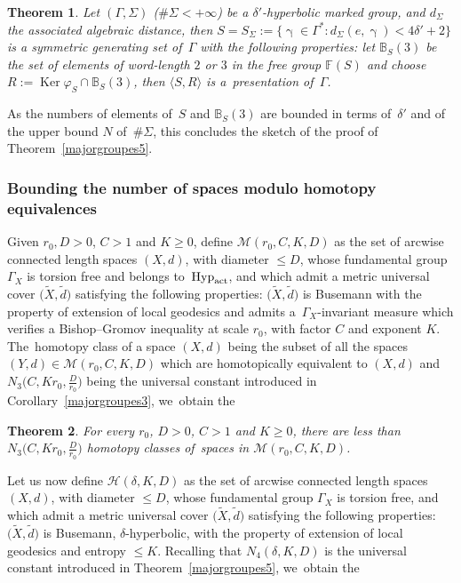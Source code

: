 \documentclass[10pt,a4paper]{amsart}
\providecommand{\cal}{\mathcal}
\numberwithin{equation}{section}
\newtheorem{theor}{Theorem}[section]
\newcommand{\Ker}{\operatorname{Ker}}
\newcommand{\g}{\operatorname{\gamma}}
\begin{document}
\begin{itemize}
\begin{theor}%
Let $(\Gamma, \Sigma)$ ($\#\Sigma <+\infty$) be a $\delta'$-hyperbolic marked group, and $d_\Sigma$ the associated algebraic distance,
then $S = S_\Sigma := \{\g \in \Gamma^*\colon d_\Sigma (e, \g) < 4 \delta' + 2 \}$ is a symmetric generating set of~$\Gamma$ with the following properties: let $\mathbb B_S (3)$ be the set of elements of word-length $2$ or $ 3$ in the free group $\mathbb F(S)$
and choose $R := \Ker \varphi_S \cap \mathbb B_S (3)$, then $\langle S, R\rangle$ is a~pre\-sentation of~$\Gamma$.
\end{theor}

As the numbers of elements of~$S$ and $\mathbb B_S (3)$ are bounded in terms of~$\delta'$ and of the upper bound $N$ of~$\# \Sigma$, this concludes the sketch of the proof of Theorem~\ref{majorgroupes5}.
\end{itemize}

\subsubsection{Bounding the number of spaces modulo homotopy equivalences}%

Given $r_0, D >0$, $C > 1$ and $K\ge 0$, define ${\cal M} (r_0, C, K,
D)$ as the set of arcwise connected length spaces $(X,d)$, with diameter $\le D$, whose
fundamental group $\Gamma_X$ is torsion free and belongs to~${\rm Hyp}_{\rm act}$, and which admit a metric universal cover $\big(\widetilde X, \tilde d\big)$
satisfying the following properties: $\big(\widetilde X, \tilde d\big)$ is Busemann with the property of extension of local geodesics and admits a~$\Gamma_X$-invariant
measure which verifies a Bishop--Gromov inequality at scale $r_0$, with factor $C$ and exponent $K$. The~homotopy class of a space $(X,d)$ being the subset
of all the spaces $(Y,d) \in {\cal M} (r_0, C, K, D)$ which are homotopically equivalent to $(X,d)$ and
$N_3 \big(C, K r_0, \frac{D}{r_0}\big)$ being the universal constant introduced in Corollary~\ref{majorgroupes3}, we~obtain the

\begin{theor}\label{boundhomotopies1}
For every $r_0$, $D >0$, $C > 1$ and $K\ge 0$, there are less than $N_3 \big(C, K r_0, \frac{D}{r_0}\big)$ homotopy classes of~spaces in ${\cal M} (r_0, C, K, D)$.
\end{theor}

Let us now define ${\cal H} (\delta, K, D)$ as the set of arcwise connected length spaces $(X,d)$, with diameter $\le D$, whose
fundamental group $\Gamma_X$ is torsion free, and which admit a metric universal cover $\big(\widetilde X, \tilde d\big)$
satisfying the following properties: $\big(\widetilde X, \tilde d\big)$ is Busemann, $\delta$-hyperbolic, with the property of extension of local geodesics and
entropy $\le K$. Recalling that $N_4 \left(\delta, K, D \right)$ is the universal constant introduced in Theorem~\ref{majorgroupes5}, we~obtain the
\end{document}
